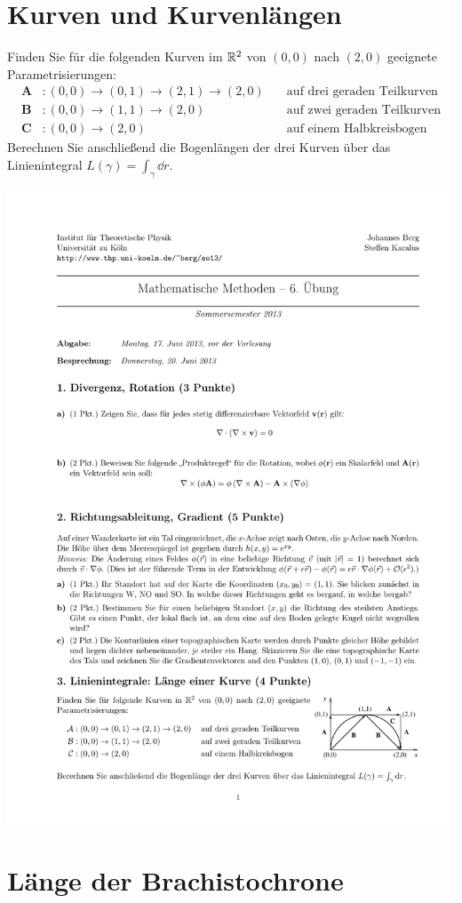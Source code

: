 \documentclass{scrartcl}
\begin{document}
\maketitle


\section{Kurven und Kurvenlängen~}
\label{sec:kurven_und_kurvenl_ngen}

Finden Sie für die folgenden Kurven im $\mathbb{R}^2$ von $(0,0)$ nach $(2,0)$ geeignete Parametrisierungen:
\begin{align*}
  \mathbf{A}&\colon (0,0) \to (0,1) \to (2,1) \to (2,0) \quad& \mbox{auf drei geraden Teilkurven} \\
  \mathbf{B}&\colon (0,0) \to (1,1) \to (2,0) \quad& \mbox{auf zwei geraden Teilkurven} \\
  \mathbf{C}&\colon (0,0) \to (2,0)  \quad& \mbox{auf einem Halbkreisbogen}
\end{align*}
Berechnen Sie anschließend die Bogenlängen der drei Kurven über das Linienintegral $L(\gamma) = \int_\gamma \dd r$.

\begin{center}
  \includegraphics[width=.5\textwidth]{img/curves}
\end{center}

\section{Länge der Brachistochrone~}
\label{sec:bachistochrone}
\end{document}
